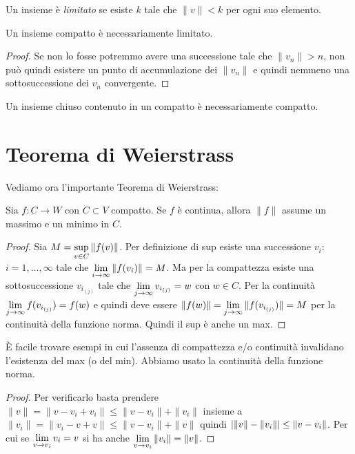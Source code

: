 \begin{definition}[limitato]
Un insieme è \emph{limitato} se esiste $k$ tale che $\|v\| < k$ per ogni
suo elemento.
\end{definition}

\begin{lemma}
Un insieme compatto è necessariamente limitato.
\end{lemma}
\begin{proof}
Se non lo fosse potremmo avere una successione tale che $\|v_n\| > n$, non
può quindi esistere un punto di accumulazione dei $\|v_n\|$ e quindi nemmeno
una sottosuccessione dei $v_n$ convergente.
\end{proof}
\begin{corollary}
Un insieme chiuso contenuto in un compatto è necessariamente compatto.
\end{corollary}

\section{Teorema di Weierstrass}
Vediamo ora l'importante Teorema di Weierstrass:
\begin{theorem}[di Weierstrass]
Sia $f: C \to W$ con $C \subset V$ compatto. Se $f$ è continua, allora
$\|f\|$ assume un massimo e un minimo in $C$.
\end{theorem}
\begin{proof}
Sia $\displaystyle M = \sup_{v \in C} \|f(v)\|$. Per definizione di sup esiste una
successione $v_i$: $i = 1, \ldots, \infty$ tale che 
$ \displaystyle \lim_{i \to \infty} \|f(v_i)\| = M$. Ma per la compattezza esiste
una sottosuccessione $v_{i_{(j)}}$ tale che 
$\displaystyle \lim_{j \to \infty} v_{i_{(j)}} = w$ con $w \in C$.
Per la continuità $\displaystyle \lim_{j \to \infty} f(v_{i_{(j)}}) = f(w)$ e quindi
deve essere $ \displaystyle \|f(w)\| = \lim_{j \to \infty} \|f(v_{i_{(j)}})\| = M$
per la continuità della funzione norma. Quindi il sup è anche un max. 
\end{proof}
È facile trovare esempi in cui l'assenza di compattezza e/o continuità
invalidano l'esistenza del max (o del min).
Abbiamo usato la continuità della funzione norma.
\begin{proof}
Per verificarlo basta prendere $\|v\|=\|v-v_i+v_i\| \leq \|v-v_i\|+\|v_i\|$
insieme a $\|v_i\| = \|v_i - v + v\| \leq \|v - v_i\| + \|v\|$ quindi
${\left|\|v\| - \|v_i\|\right|} \leq \|v-v_i\|$. Per cui se 
$\displaystyle \lim_{v \to v_i} v_i = v$ si ha anche
$\displaystyle \lim_{v \to v_i} \|v_i\| = \|v\|$.
\end{proof}

